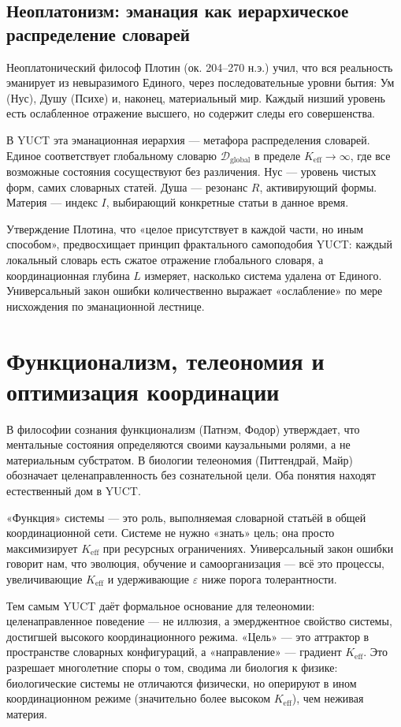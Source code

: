 \documentclass[12pt,a4paper]{article}
\begin{document}
	\subsection{Неоплатонизм: эманация как иерархическое распределение словарей}
	
	Неоплатонический философ Плотин (ок. 204–270 н.э.) учил, что вся реальность эманирует из невыразимого Единого, через последовательные уровни бытия: Ум (Нус), Душу (Психе) и, наконец, материальный мир. Каждый низший уровень есть ослабленное отражение высшего, но содержит следы его совершенства.
	
	В YUCT эта эманационная иерархия — метафора распределения словарей. Единое соответствует глобальному словарю \(\mathcal{D}_{\text{global}}\) в пределе \(K_{\mathrm{eff}} \to \infty\), где все возможные состояния сосуществуют без различения. Нус — уровень чистых форм, самих словарных статей. Душа — резонанс \(R\), активирующий формы. Материя — индекс \(I\), выбирающий конкретные статьи в данное время.
	
	Утверждение Плотина, что «целое присутствует в каждой части, но иным способом», предвосхищает принцип фрактального самоподобия YUCT: каждый локальный словарь есть сжатое отражение глобального словаря, а координационная глубина \(L\) измеряет, насколько система удалена от Единого. Универсальный закон ошибки количественно выражает «ослабление» по мере нисхождения по эманационной лестнице.
	
	\section{Функционализм, телеономия и оптимизация координации}
	
	В философии сознания функционализм (Патнэм, Фодор) утверждает, что ментальные состояния определяются своими каузальными ролями, а не материальным субстратом. В биологии телеономия (Питтендрай, Майр) обозначает целенаправленность без сознательной цели. Оба понятия находят естественный дом в YUCT.
	
	«Функция» системы — это роль, выполняемая словарной статьёй в общей координационной сети. Системе не нужно «знать» цель; она просто максимизирует \(K_{\mathrm{eff}}\) при ресурсных ограничениях. Универсальный закон ошибки говорит нам, что эволюция, обучение и самоорганизация — всё это процессы, увеличивающие \(K_{\mathrm{eff}}\) и удерживающие \(\varepsilon\) ниже порога толерантности.
	
	Тем самым YUCT даёт формальное основание для телеономии: целенаправленное поведение — не иллюзия, а эмерджентное свойство системы, достигшей высокого координационного режима. «Цель» — это аттрактор в пространстве словарных конфигураций, а «направление» — градиент \(K_{\mathrm{eff}}\). Это разрешает многолетние споры о том, сводима ли биология к физике: биологические системы не отличаются физически, но оперируют в ином координационном режиме (значительно более высоком \(K_{\mathrm{eff}}\)), чем неживая материя.
	
\end{document}
